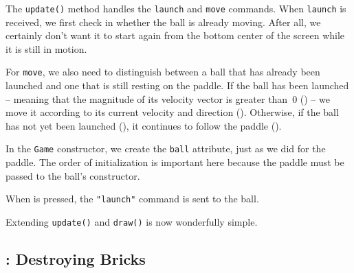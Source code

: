 The \texttt{update()} method handles the \texttt{launch} and \texttt{move} commands. When \texttt{launch} is received, we first check in  whether the ball is already moving. After all, we certainly don't want it to start again from the bottom center of the screen while it is still in motion.

For \texttt{move}, we also need to distinguish between a ball that has already been launched and one that is still resting on the paddle. If the ball has been launched -- meaning that the magnitude of its velocity vector is greater than~0 () -- we move it according to its current velocity and direction (). Otherwise, if the ball has not yet been launched (), it continues to follow the paddle ().



In the \texttt{Game} constructor, we create the \texttt{ball} attribute, just as we did for the paddle. The order of initialization is important here because the paddle must be passed to the ball's constructor.


When  is pressed, the \verb="launch"= command is sent to the ball.


Extending \texttt{update()} and \texttt{draw()} is now wonderfully simple.


\newpage
\subsection{: Destroying Bricks}

